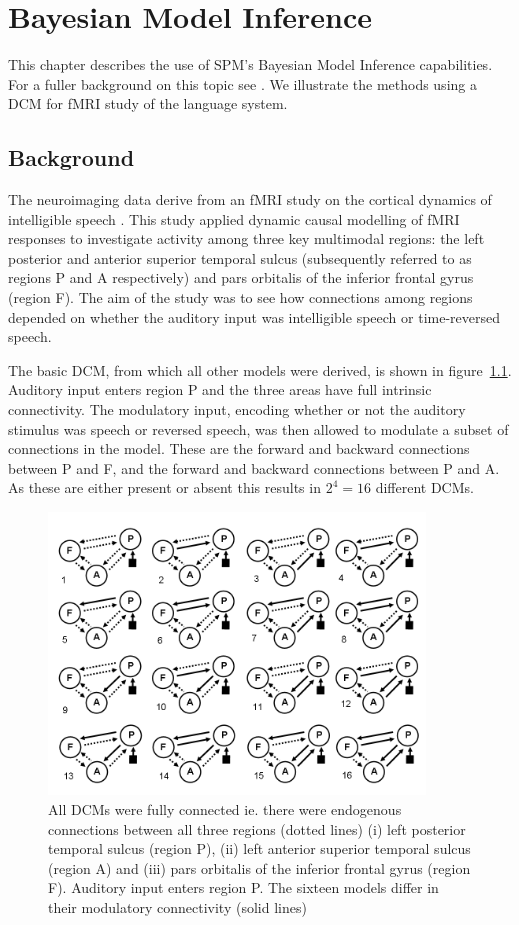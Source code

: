 \chapter{Bayesian Model Inference \label{Chap:data:dcm_bms}}

This chapter describes the use of SPM's Bayesian Model Inference capabilities.
For a fuller background on this topic see \cite{dcm_families}.
We illustrate the methods using a DCM for fMRI study of the language system.

\section{Background}

The neuroimaging data derive from an fMRI study on the cortical dynamics of intelligible speech \cite{leff_speech}. 
This study applied dynamic causal modelling of fMRI responses to investigate  activity among three key multimodal regions: the left posterior and anterior superior temporal sulcus (subsequently referred to as regions P and A respectively) and pars orbitalis of the inferior frontal gyrus (region F). 
The aim of the study was to see how connections among regions depended on whether the auditory input was intelligible speech or time-reversed speech.

The basic DCM, from which all other models were derived, is shown in figure~\ref{dcms}. Auditory input enters region P and the three areas have full intrinsic connectivity. The modulatory input, encoding whether or not the auditory stimulus was speech or reversed speech, was then allowed to modulate a 
subset of connections in the model. These are the forward and backward connections between P and F, and the forward and backward connections between P and A. As these are either present or absent this results in $2^4=16$ different DCMs. 

\begin{figure}
\begin{center}
\includegraphics[width=100mm]{bms/Slide1.png}
\caption{All DCMs were fully connected ie. there were endogenous connections between all three regions (dotted lines) (i)  left posterior temporal sulcus (region P), (ii) left anterior superior temporal sulcus (region A) and (iii) pars orbitalis of the inferior frontal gyrus (region F). Auditory input enters region P. The sixteen models differ in their modulatory connectivity (solid lines) \label{dcms}}
\end{center}
\end{figure}

